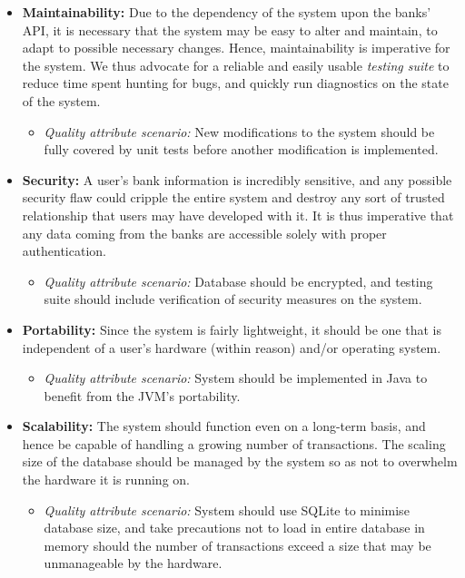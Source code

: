 \documentclass[11pt]{article}
\newcounter{use case ID}
\begin{document}
\begin{itemize}
\begin{itemize}
        \end{itemize}
    \item \textbf{Maintainability:} Due to the dependency of the system upon the banks' API, it is necessary that the system may be easy to alter and maintain, to adapt to possible necessary changes. Hence, maintainability is imperative for the system. We thus advocate for a reliable and easily usable \textit{testing suite} to reduce time spent hunting for bugs, and quickly run diagnostics on the state of the system.
        \begin{itemize}
            \item \textit{Quality attribute scenario:} New modifications to the system should be fully covered by unit tests before another modification is implemented.
        \end{itemize}
    \item \textbf{Security:} A user's bank information is incredibly sensitive, and any possible security flaw could cripple the entire system and destroy any sort of trusted relationship that users may have developed with it. It is thus imperative that any data coming from the banks are accessible solely with proper authentication.
        \begin{itemize}
            \item \textit{Quality attribute scenario:} Database should be encrypted, and testing suite should include verification of security measures on the system.
        \end{itemize}
    \item \textbf{Portability:} Since the system is fairly lightweight, it should be one that is independent of a user's hardware (within reason) and/or operating system.
        \begin{itemize}
            \item \textit{Quality attribute scenario:} System should be implemented in Java to benefit from the JVM's portability.
        \end{itemize}
    \item \textbf{Scalability:} The system should function even on a long-term basis, and hence be capable of handling a growing number of transactions. The scaling size of the database should be managed by the system so as not to overwhelm the hardware it is running on.
        \begin{itemize}
            \item \textit{Quality attribute scenario:} System should use SQLite to minimise database size, and take precautions not to load in entire database in memory should the number of transactions exceed a size that may be unmanageable by the hardware.
        \end{itemize}
\end{itemize}
\end{document}
